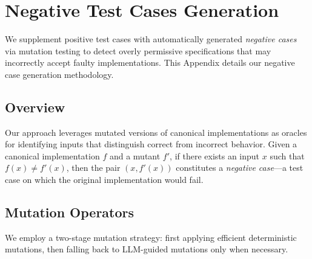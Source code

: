\section{Negative Test Cases Generation}
\label{appendix:nega}

We supplement positive test cases with automatically generated \emph{negative cases} via mutation testing to detect overly permissive specifications that may incorrectly accept faulty implementations. This Appendix details our negative case generation methodology.

\subsection{Overview}

Our approach leverages mutated versions of canonical implementations as oracles for identifying inputs that distinguish correct from incorrect behavior. Given a canonical implementation $f$ and a mutant $f'$, if there exists an input $x$ such that $f(x) \neq f'(x)$, then the pair $(x, f'(x))$ constitutes a \emph{negative case}---a test case on which the original implementation would fail.

\subsection{Mutation Operators}

We employ a two-stage mutation strategy: first applying efficient deterministic mutations, then falling back to LLM-guided mutations only when necessary.


